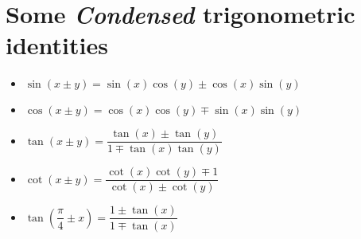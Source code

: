 \documentclass{article}
\begin{document}
\section{Some \textit{Condensed} trigonometric identities}
\begin{itemize}
\item $\sin(x \pm y)=\sin(x)\cos(y)\pm\cos(x)\sin(y)$
\item $\cos(x \pm y)=\cos(x)\cos(y)\mp\sin(x)\sin(y)$
\item $\tan(x\pm y)=\dfrac{\tan(x)\pm\tan(y)}{1\mp\tan(x)\tan(y)}$
\item $\cot(x\pm y)=\dfrac{\cot(x)\cot(y)\mp 1}{\cot(x)\pm\cot(y)}$
\item $\tan\left(\dfrac{\pi}{4} \pm x\right) = \dfrac{1 \pm \tan(x)}{1 \mp \tan(x)}$
\end{itemize}
\end{document}
